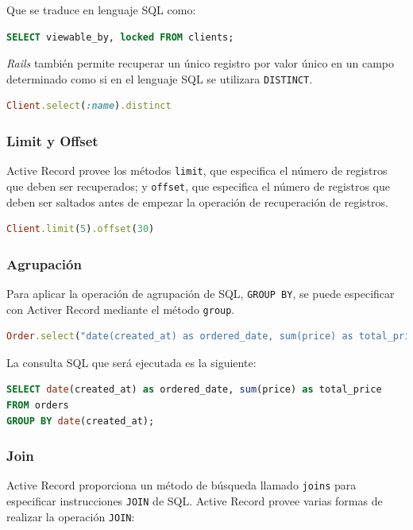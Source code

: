 Que se traduce en lenguaje SQL como:

\begin{lstlisting}[language=SQL]
SELECT viewable_by, locked FROM clients;
\end{lstlisting}

\textit{Rails} también permite recuperar un único registro por valor único en un campo determinado como si en el lenguaje SQL se utilizara \texttt{DISTINCT}.

\begin{lstlisting}[language=Ruby]
Client.select(:name).distinct
\end{lstlisting}


\subsubsection{Limit y Offset}
Active Record provee los métodos \texttt{limit}, que especifica el número de registros que deben ser recuperados; y \texttt{offset}, que especifica el número de registros que deben ser saltados antes de empezar la operación de recuperación de registros.

\begin{lstlisting}[language=Ruby]
Client.limit(5).offset(30)
\end{lstlisting}


\subsubsection{Agrupación}
Para aplicar la operación de agrupación de SQL, \texttt{GROUP BY}, se puede especificar con Activer Record mediante el método \texttt{group}.

\begin{lstlisting}[language=Ruby]
Order.select("date(created_at) as ordered_date, sum(price) as total_price").group("date(created_at)")
\end{lstlisting}

La consulta SQL que será ejecutada es la siguiente:

\begin{lstlisting}[language=SQL]
SELECT date(created_at) as ordered_date, sum(price) as total_price
FROM orders
GROUP BY date(created_at);
\end{lstlisting}

\subsubsection{Join}
Active Record proporciona un método de búsqueda llamado \texttt{joins} para especificar instrucciones \texttt{JOIN} de SQL.
Active Record provee varias formas de realizar la operación \texttt{JOIN}:

